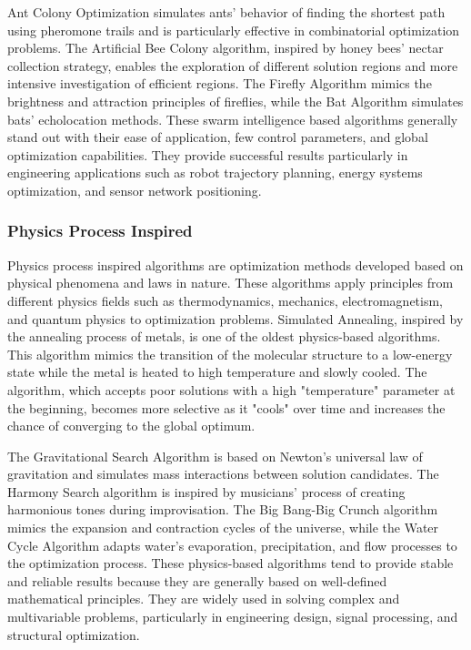Ant Colony Optimization simulates ants' behavior of finding the shortest path using pheromone trails and is particularly effective in combinatorial optimization problems. The Artificial Bee Colony algorithm, inspired by honey bees' nectar collection strategy, enables the exploration of different solution regions and more intensive investigation of efficient regions. The Firefly Algorithm mimics the brightness and attraction principles of fireflies, while the Bat Algorithm simulates bats' echolocation methods. These swarm intelligence based algorithms generally stand out with their ease of application, few control parameters, and global optimization capabilities. They provide successful results particularly in engineering applications such as robot trajectory planning, energy systems optimization, and sensor network positioning.

\subsubsection{Physics Process Inspired}

Physics process inspired algorithms are optimization methods developed based on physical phenomena and laws in nature. These algorithms apply principles from different physics fields such as thermodynamics, mechanics, electromagnetism, and quantum physics to optimization problems. Simulated Annealing, inspired by the annealing process of metals, is one of the oldest physics-based algorithms. This algorithm mimics the transition of the molecular structure to a low-energy state while the metal is heated to high temperature and slowly cooled. The algorithm, which accepts poor solutions with a high "temperature" parameter at the beginning, becomes more selective as it "cools" over time and increases the chance of converging to the global optimum.

The Gravitational Search Algorithm is based on Newton's universal law of gravitation and simulates mass interactions between solution candidates. The Harmony Search algorithm is inspired by musicians' process of creating harmonious tones during improvisation. The Big Bang-Big Crunch algorithm mimics the expansion and contraction cycles of the universe, while the Water Cycle Algorithm adapts water's evaporation, precipitation, and flow processes to the optimization process. These physics-based algorithms tend to provide stable and reliable results because they are generally based on well-defined mathematical principles. They are widely used in solving complex and multivariable problems, particularly in engineering design, signal processing, and structural optimization.

